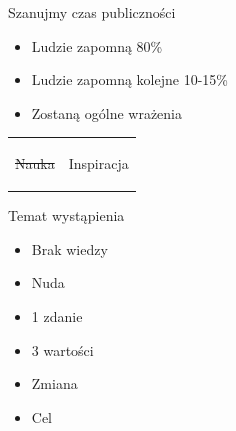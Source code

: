 \documentclass{beamer}
\begin{document}
\begin{frame}{}
	\begin{center}
		\Huge{Szanujmy czas publiczności}
	\end{center}
\end{frame}

\begin{frame}{}
	\begin{Large}
		\begin{itemize}
			\item Ludzie zapomną 80\%
			\item Ludzie zapomną kolejne 10-15\%
			\item Zostaną ogólne wrażenia
		\end{itemize}
	\end{Large}
\end{frame}

\begin{frame}{}
	\begin{tabular}{ p{5cm} p{5cm} }
		\begin{minipage}{.5\textwidth}
	\begin{center}
		\Huge{\sout{Nauka}}
	\end{center}
   		 \end{minipage}
   		 &
		\begin{minipage}{.5\textwidth}
	\begin{center}
		\Huge{Inspiracja}
	\end{center}
   		 \end{minipage}
	\end{tabular}
\end{frame}

\begin{frame}{}
	\begin{center}
		\Huge{Temat wystąpienia}
	\end{center}
\end{frame}

\begin{frame}{}
	\begin{Large}
		\begin{itemize}
			\item Brak wiedzy
			\item Nuda
			\item 1 zdanie
			\item 3 wartości
			\item Zmiana
			\item Cel
		\end{itemize}
	\end{Large}
\end{frame}
\end{document}
